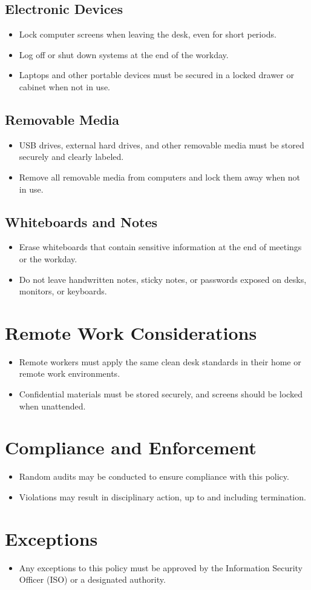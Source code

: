 \subsection{Electronic Devices}
\begin{itemize}
    \item Lock computer screens when leaving the desk, even for short periods.
    \item Log off or shut down systems at the end of the workday.
    \item Laptops and other portable devices must be secured in a locked drawer or cabinet when not in use.
\end{itemize}
\subsection{Removable Media}
\begin{itemize}
    \item USB drives, external hard drives, and other removable media must be stored securely and clearly labeled.
    \item Remove all removable media from computers and lock them away when not in use.
\end{itemize}
\subsection{Whiteboards and Notes}
\begin{itemize}
    \item Erase whiteboards that contain sensitive information at the end of meetings or the workday.
    \item Do not leave handwritten notes, sticky notes, or passwords exposed on desks, monitors, or keyboards.
\end{itemize}
\section{Remote Work Considerations}
\begin{itemize}
    \item Remote workers must apply the same clean desk standards in their home or remote work environments.
    \item Confidential materials must be stored securely, and screens should be locked when unattended.
\end{itemize}
\section{Compliance and Enforcement}
\begin{itemize}
    \item Random audits may be conducted to ensure compliance with this policy.
    \item Violations may result in disciplinary action, up to and including termination.
\end{itemize}
\section{Exceptions}
\begin{itemize}
    \item Any exceptions to this policy must be approved by the Information Security Officer (ISO) or a designated authority.
\end{itemize}
